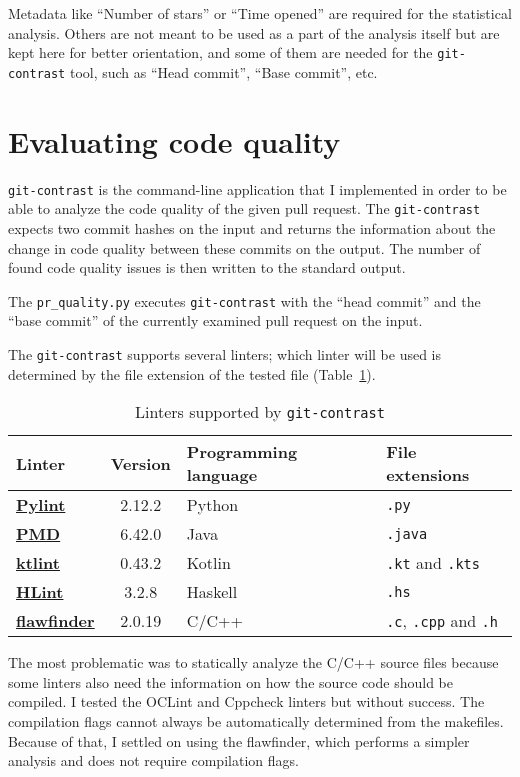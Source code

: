 \documentclass[digital,oneside,oldtable,nolof,nolot,nocover]{fithesis4}
\begin{document}
Metadata like ``Number of stars'' or ``Time opened'' are required for the
statistical analysis.  Others are not meant to be used as a part of the
analysis itself but are kept here for better orientation, and some of them
are needed for the \texttt{git-contrast} tool, such as ``Head commit'', ``Base commit'', etc.
\FloatBarrier
\section{Evaluating code quality}
\label{sec:org0aee2b2}
\texttt{git-contrast} is the command-line application that I implemented in order to
be able to analyze the code quality of the given pull request. The \texttt{git-contrast}
expects two commit hashes on the input and returns the information about the
change in code quality between these commits on the output.
The number of found code quality issues is
then written to the standard output.

The \texttt{pr\_quality.py} executes \texttt{git-contrast} with the ``head commit'' and the ``base commit'' of the
currently examined pull request on the input.

The \texttt{git-contrast} supports several linters; which linter will be
used is determined by the file extension of the tested file (Table~\ref{tab:org8f64843}).
\begin{table}[htbp]
\caption{\label{tab:org8f64843}Linters supported by \texttt{git-contrast}}
\centering
\scriptsize
\begin{tabular}{|lcll|}
\hline
Linter & Version & Programming language & File extensions\\
\hline
\hline
\href{https://pylint.pycqa.org/}{\textbf{Pylint}} & 2.12.2 & Python & \texttt{.py}\\
\href{https://pmd.github.io/}{\textbf{PMD}} & 6.42.0 & Java & \texttt{.java}\\
\href{https://ktlint.github.io/}{\textbf{ktlint}} & 0.43.2 & Kotlin & \texttt{.kt} and \texttt{.kts}\\
\href{https://github.com/ndmitchell/hlint}{\textbf{HLint}} & 3.2.8 & Haskell & \texttt{.hs}\\
\href{https://dwheeler.com/flawfinder/}{\textbf{flawfinder}} & 2.0.19 & C/C++ & \texttt{.c}, \texttt{.cpp} and \texttt{.h}\\
\hline
\end{tabular}
\end{table}

The most problematic was to statically analyze the C/C++ source files because
some linters also need the information on how the source code should be
compiled. I tested the OCLint and Cppcheck linters but without success.
The compilation flags cannot always be automatically determined from the makefiles.
Because of that, I settled on using the flawfinder, which performs a simpler analysis and
does not require compilation flags.
\end{document}

